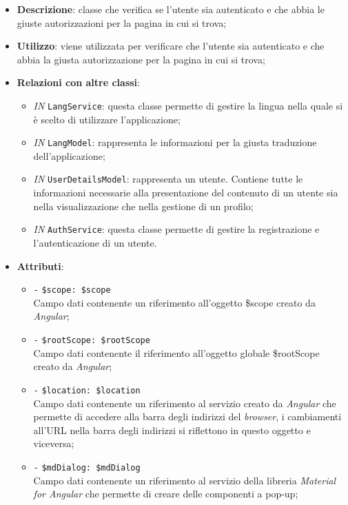 		\begin{itemize}
			\item \textbf{Descrizione}: classe che verifica se l'utente sia autenticato e che abbia le giuste autorizzazioni per la pagina in cui si trova;
			\item \textbf{Utilizzo}: viene utilizzata per verificare che l’utente sia autenticato e che abbia la giusta autorizzazione per la pagina in cui si trova;
			\item \textbf{Relazioni con altre classi}: 
			\begin{itemize}
				\item \textit{IN} \texttt{LangService}: questa classe permette di gestire la lingua nella quale si è scelto di utilizzare l'applicazione;
				\item \textit{IN} \texttt{LangModel}: rappresenta le informazioni per la giusta traduzione dell'applicazione;
				\item \textit{IN} \texttt{UserDetailsModel}: rappresenta un utente. Contiene tutte le informazioni necessarie alla presentazione del contenuto di un utente sia nella visualizzazione che nella gestione di un profilo;
				\item \textit{IN} \texttt{AuthService}: questa classe permette di gestire la registrazione e l'autenticazione di un utente.
			\end{itemize}
			\item \textbf{Attributi}: 
			\begin{itemize}
				\item \texttt{-} \texttt{\$scope: \$scope} \\
				Campo dati contenente un riferimento all’oggetto \$scope creato da \textit{Angular};
				\item \texttt{-} \texttt{\$rootScope: \$rootScope} \\
				Campo dati contenente il riferimento all'oggetto globale \$rootScope creato da \textit{Angular};
				\item \texttt{-} \texttt{\$location: \$location} \\
				Campo dati contenente un riferimento al servizio creato da \textit{Angular} che permette di accedere alla barra degli indirizzi del \textit{browser}, i cambiamenti all’URL nella barra degli indirizzi si riflettono in questo oggetto e viceversa;
				\item \texttt{-} \texttt{\$mdDialog: \$mdDialog} \\
				Campo dati contenente un riferimento al servizio della libreria \textit{Material for Angular} che permette di creare delle componenti a pop-up;

\end{itemize}
\end{itemize}
